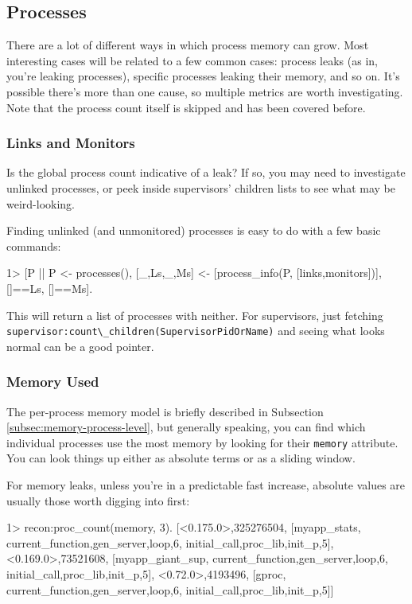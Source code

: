 \documentclass[11pt, oneside]{book}   	%
\newcommand{\expression}[1]{\Verb`#1`}
\newcommand{\term}[1]{\Verb`#1`}
\begin{document}
\subsection{Processes}

There are a lot of different ways in which process memory can grow. Most interesting cases will be related to a few common cases: process leaks (as in, you're leaking processes), specific processes leaking their memory, and so on. It's possible there's more than one cause, so multiple metrics are worth investigating. Note that the process count itself is skipped and has been covered before.

\subsubsection{Links and Monitors}

Is the global process count indicative of a leak? If so, you may need to investigate unlinked processes, or peek inside supervisors' children lists to see what may be weird-looking.

Finding unlinked (and unmonitored) processes is easy to do with a few basic commands:

\begin{VerbatimEshell}
1> [P || P <- processes(),
         [{_,Ls},{_,Ms}] <- [process_info(P, [links,monitors])],
         []==Ls, []==Ms].
\end{VerbatimEshell}

This will return a list of processes with neither. For supervisors, just fetching \newline \expression{supervisor:count\_children(SupervisorPidOrName)} and seeing what looks normal can be a good pointer.


\subsubsection{Memory Used}

The per-process memory model is briefly described in Subsection \ref{subsec:memory-process-level}, but generally speaking, you can find which individual processes use the most memory by looking for their \term{memory} attribute. You can look things up either as absolute terms or as a sliding window.

For memory leaks, unless you're in a predictable fast increase, absolute values are usually those worth digging into first:

\begin{VerbatimEshell}
1> recon:proc_count(memory, 3).
[{<0.175.0>,325276504,
  [myapp_stats,
   {current_function,{gen_server,loop,6}},
   {initial_call,{proc_lib,init_p,5}}]},
 {<0.169.0>,73521608,
  [myapp_giant_sup,
   {current_function,{gen_server,loop,6}},
   {initial_call,{proc_lib,init_p,5}}]},
 {<0.72.0>,4193496,
  [gproc,
   {current_function,{gen_server,loop,6}},
   {initial_call,{proc_lib,init_p,5}}]}]
\end{VerbatimEshell}
\end{document}
